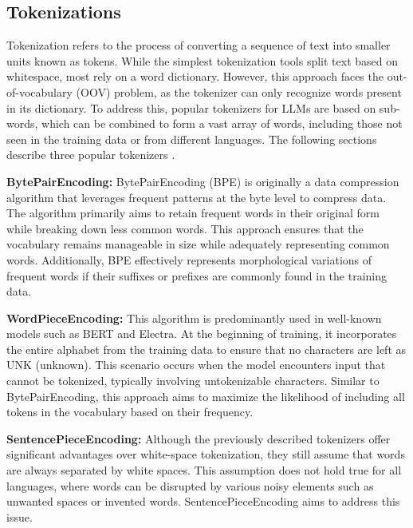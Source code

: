 \subsection{Tokenizations}

Tokenization refers to the process of converting a sequence of text into smaller units known as tokens. While the simplest tokenization tools split text based on whitespace, most rely on a word dictionary. However, this approach faces the out-of-vocabulary (OOV) problem, as the tokenizer can only recognize words present in its dictionary. To address this, popular tokenizers for LLMs are based on sub-words, which can be combined to form a vast array of words, including those not seen in the training data or from different languages. The following sections describe three popular tokenizers \cite{minaee2024large}.

\textbf{BytePairEncoding:} BytePairEncoding (BPE) is originally a data compression algorithm that leverages frequent patterns at the byte level to compress data. The algorithm primarily aims to retain frequent words in their original form while breaking down less common words. This approach ensures that the vocabulary remains manageable in size while adequately representing common words. Additionally, BPE effectively represents morphological variations of frequent words if their suffixes or prefixes are commonly found in the training data.

\textbf{WordPieceEncoding:} This algorithm is predominantly used in well-known models such as BERT and Electra. At the beginning of training, it incorporates the entire alphabet from the training data to ensure that no characters are left as UNK (unknown). This scenario occurs when the model encounters input that cannot be tokenized, typically involving untokenizable characters. Similar to BytePairEncoding, this approach aims to maximize the likelihood of including all tokens in the vocabulary based on their frequency.

\textbf{SentencePieceEncoding:} Although the previously described tokenizers offer significant advantages over white-space tokenization, they still assume that words are always separated by white spaces. This assumption does not hold true for all languages, where words can be disrupted by various noisy elements such as unwanted spaces or invented words. SentencePieceEncoding aims to address this issue.